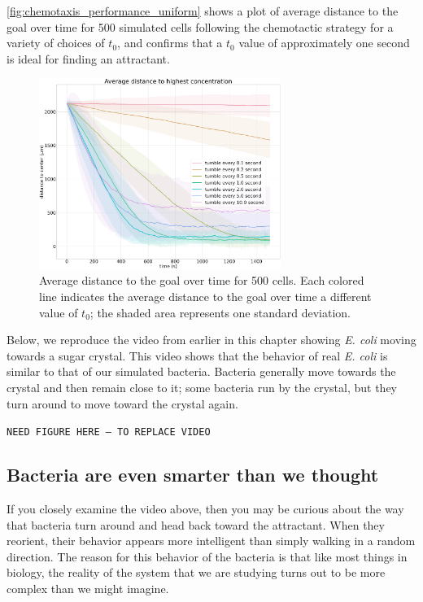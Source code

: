\autoref{fig:chemotaxis_performance_uniform} shows a plot of average distance to the goal over time for 500 simulated cells following the chemotactic strategy for a variety of choices of $t_0$, and confirms that a $t_0$ value of approximately one second is ideal for finding an attractant.


\begin{figure}[h]
\centering
\mySfFamily
\includegraphics[width = 0.7\textwidth]{../images/chemotaxis_performance_uniform.png}
\caption{Average distance to the goal over time for 500 cells. Each colored line indicates the average distance to the goal over time a different value of $t_0$; the shaded area represents one standard deviation.}
\label{fig:chemotaxis_performance_uniform}
\end{figure}


Below, we reproduce the video from earlier in this chapter showing \textit{E. coli} moving towards a sugar crystal. This video shows that the behavior of real \textit{E. coli} is similar to that of our simulated bacteria. Bacteria generally move towards the crystal and then remain close to it; some bacteria run by the crystal, but they turn around to move toward the crystal again.

\texttt{NEED FIGURE HERE -- TO REPLACE VIDEO}\\


\FloatBarrier
{}
{}
\subsection{Bacteria are even smarter than we thought}

If you closely examine the video above, then you may be curious about the way that bacteria turn around and head back toward the attractant. When they reorient, their behavior appears more intelligent than simply walking in a random direction. The reason for this behavior of the bacteria is that like most things in biology, the reality of the system that we are studying turns out to be more complex than we might imagine.


